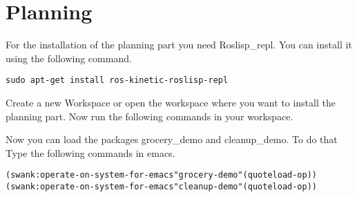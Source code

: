 \documentclass[main.tex]{subfiles}
\begin{document}
	\section{Planning}
	\label{sec:Planning}
	For the installation of the planning part you need Roslisp\_repl.
	You can install it using the following command.
	\begin{lstlisting}
sudo apt-get install ros-kinetic-roslisp-repl 
\end{lstlisting}

	Create a new Workspace or open the workspace where you want to install the planning part. Now run the following commands in your workspace.\\
\begin{mdframed}[backgroundcolor=mygray, rightline=false]

\end{mdframed}
	
	Now you can load the packages grocery\_demo and cleanup\_demo.
	To do that Type the following commands in emacs.
	\begin{lstlisting}
(swank:operate-on-system-for-emacs"grocery-demo"(quoteload-op))
(swank:operate-on-system-for-emacs"cleanup-demo"(quoteload-op)) 
\end{lstlisting}
	
\end{document}
